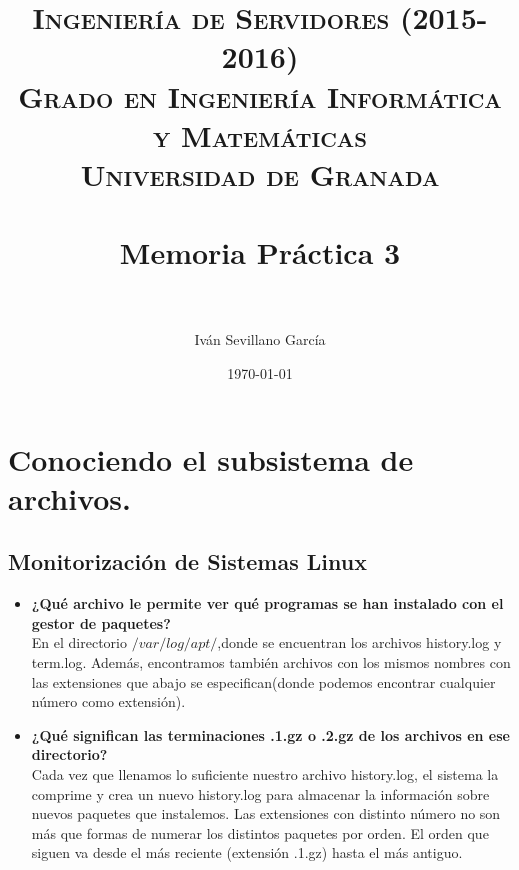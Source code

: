 

\title{	
	\normalfont \normalsize 
	\textsc{{\bf Ingeniería de Servidores (2015-2016)} \\ Grado en Ingeniería Informática y Matemáticas \\ Universidad de Granada} \\ [25pt] %
	\horrule{0.5pt} \\[0.4cm] %
	\huge Memoria Práctica 3 \\ %
	\horrule{2pt} \\[0.5cm] %
}

\author{Iván Sevillano García} %

\date{\normalsize\today} %



\maketitle %

\newpage %

\tableofcontents %

\newpage

\section{Conociendo el subsistema de archivos.}

\subsection{Monitorización de Sistemas Linux}

\begin{itemize}
	\item \textbf{¿Qué archivo le permite ver qué programas se han instalado con el gestor de paquetes?}\\
	En el directorio $/var/log/apt/$,donde se encuentran los archivos history.log y term.log. Además, encontramos también archivos con los mismos nombres con las extensiones que abajo se especifican(donde podemos encontrar cualquier número como extensión).
	
	\item \textbf{¿Qué significan las terminaciones .1.gz o .2.gz de los archivos en ese directorio?}\\
	Cada vez que llenamos lo suficiente nuestro archivo history.log, el sistema la comprime y crea un nuevo history.log para almacenar la información sobre nuevos paquetes que instalemos. Las extensiones con distinto número no son más que formas de numerar los distintos paquetes por orden. El orden que siguen va desde el más reciente (extensión .1.gz) hasta el más antiguo.
	
\end{itemize}

